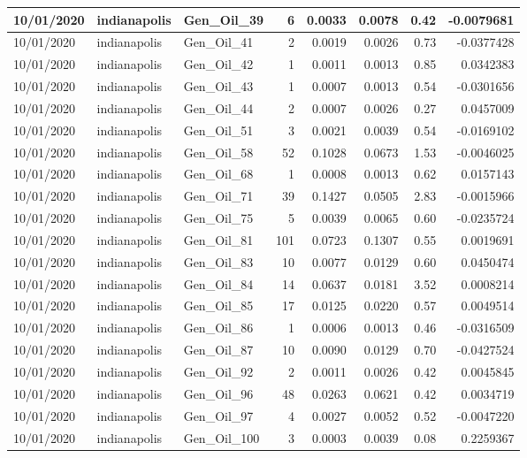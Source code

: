 \documentclass[
  letterpaper,
  DIV=11,
  numbers=noendperiod]{scrartcl}
\begin{document}
\begin{tabular}{l|l|l|r|r|r|r|r}
\hline
10/01/2020 & indianapolis & Gen\_Oil\_39 & 6 & 0.0033 & 0.0078 & 0.42 & -0.0079681\\
\hline
10/01/2020 & indianapolis & Gen\_Oil\_41 & 2 & 0.0019 & 0.0026 & 0.73 & -0.0377428\\
\hline
10/01/2020 & indianapolis & Gen\_Oil\_42 & 1 & 0.0011 & 0.0013 & 0.85 & 0.0342383\\
\hline
10/01/2020 & indianapolis & Gen\_Oil\_43 & 1 & 0.0007 & 0.0013 & 0.54 & -0.0301656\\
\hline
10/01/2020 & indianapolis & Gen\_Oil\_44 & 2 & 0.0007 & 0.0026 & 0.27 & 0.0457009\\
\hline
10/01/2020 & indianapolis & Gen\_Oil\_51 & 3 & 0.0021 & 0.0039 & 0.54 & -0.0169102\\
\hline
10/01/2020 & indianapolis & Gen\_Oil\_58 & 52 & 0.1028 & 0.0673 & 1.53 & -0.0046025\\
\hline
10/01/2020 & indianapolis & Gen\_Oil\_68 & 1 & 0.0008 & 0.0013 & 0.62 & 0.0157143\\
\hline
10/01/2020 & indianapolis & Gen\_Oil\_71 & 39 & 0.1427 & 0.0505 & 2.83 & -0.0015966\\
\hline
10/01/2020 & indianapolis & Gen\_Oil\_75 & 5 & 0.0039 & 0.0065 & 0.60 & -0.0235724\\
\hline
10/01/2020 & indianapolis & Gen\_Oil\_81 & 101 & 0.0723 & 0.1307 & 0.55 & 0.0019691\\
\hline
10/01/2020 & indianapolis & Gen\_Oil\_83 & 10 & 0.0077 & 0.0129 & 0.60 & 0.0450474\\
\hline
10/01/2020 & indianapolis & Gen\_Oil\_84 & 14 & 0.0637 & 0.0181 & 3.52 & 0.0008214\\
\hline
10/01/2020 & indianapolis & Gen\_Oil\_85 & 17 & 0.0125 & 0.0220 & 0.57 & 0.0049514\\
\hline
10/01/2020 & indianapolis & Gen\_Oil\_86 & 1 & 0.0006 & 0.0013 & 0.46 & -0.0316509\\
\hline
10/01/2020 & indianapolis & Gen\_Oil\_87 & 10 & 0.0090 & 0.0129 & 0.70 & -0.0427524\\
\hline
10/01/2020 & indianapolis & Gen\_Oil\_92 & 2 & 0.0011 & 0.0026 & 0.42 & 0.0045845\\
\hline
10/01/2020 & indianapolis & Gen\_Oil\_96 & 48 & 0.0263 & 0.0621 & 0.42 & 0.0034719\\
\hline
10/01/2020 & indianapolis & Gen\_Oil\_97 & 4 & 0.0027 & 0.0052 & 0.52 & -0.0047220\\
\hline
10/01/2020 & indianapolis & Gen\_Oil\_100 & 3 & 0.0003 & 0.0039 & 0.08 & 0.2259367\\

\end{tabular}
\end{document}
